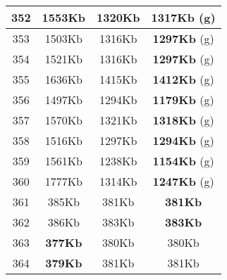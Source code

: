 \begin{table}[H]
\begin{minipage}{5cm}
{\begin{tabular}{|c|c|c|c|}
\hline
352 & 1553Kb & 1320Kb & \textbf{1317Kb} (g) \\
\hline
353 & 1503Kb & 1316Kb & \textbf{1297Kb} (g) \\
\hline
354 & 1521Kb & 1316Kb & \textbf{1297Kb} (g) \\
\hline
355 & 1636Kb & 1415Kb & \textbf{1412Kb} (g) \\
\hline
356 & 1497Kb & 1294Kb & \textbf{1179Kb} (g) \\
\hline
357 & 1570Kb & 1321Kb & \textbf{1318Kb} (g) \\
\hline
358 & 1516Kb & 1297Kb & \textbf{1294Kb} (g) \\
\hline
359 & 1561Kb & 1238Kb & \textbf{1154Kb} (g) \\
\hline
360 & 1777Kb & 1314Kb & \textbf{1247Kb} (g) \\
\hline
361 & 385Kb & 381Kb & \textbf{381Kb} \\
\hline
362 & 386Kb & 383Kb & \textbf{383Kb} \\
\hline
363 & \textbf{377Kb} & 380Kb & 380Kb \\
\hline
364 & \textbf{379Kb} & 381Kb & 381Kb \\
\hline
\end{tabular}
}
\end{minipage}
\end{table}

\begin{table}[H]
\begin{minipage}{5cm} 
\end{minipage}
\caption{Memoria di esecuzione in kilobyte dei problemi Disjunctive Binding (FOF) di Vampire, 1b naif e 1b}
\label{tab:fof_db_mem}
\end{table}
